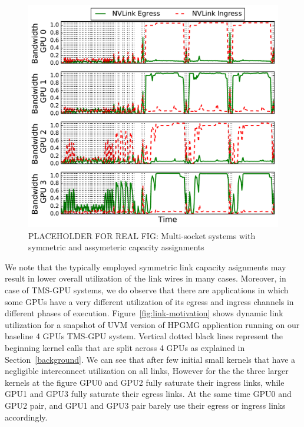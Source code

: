 \begin{figure}[t]
    \centering
    \includegraphics[width=1.0\columnwidth]{figures/bw_profile_HPGMG_UVM_base.pdf}
    \caption{PLACEHOLDER FOR REAL FIG: Multi-socket systems with symmetric and
    assymeteric capacity assignments}
    \label{fig:symmetric_assymetric}
\end{figure}

We note that the typically employed symmetric link
capacity asignments may result in lower overall utilization of the link wires
in many cases. Moreover, in case of TMS-GPU systems, we do observe that there
are applications in which some GPUs have a very different utilization of its
egress and ingress channels in different phases of execution.
Figure~\ref{fig:link-motivation} shows dynamic link utilization for a snapshot
of UVM version of HPGMG application running on our baseline 4 GPUs TMS-GPU
system. Vertical dotted black lines represent the beginning kernel calls that
are split across 4 GPUs as explained in Section~\ref{background}. We can see
that after few initial small kernels that have a negligible interconnect
utilization on all links, However for the the three larger kernels at the
figure GPU0 and GPU2 fully saturate their ingress links, while GPU1 and GPU3
fully saturate their egress links. At the same time GPU0 and GPU2 pair,
and GPU1 and GPU3 pair barely use their egress or ingress links accordingly.

